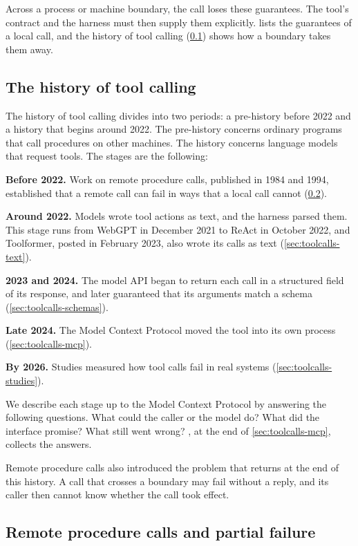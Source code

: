 Across a process or machine boundary, the call loses these guarantees. The tool's contract and the
harness must then supply them explicitly.  lists the guarantees of a local call,
and the history of tool calling (\cref{sec:toolcalls-history}) shows how a boundary takes them away.

\subsection{The history of tool calling}
\label{sec:toolcalls-history}

The history of tool calling divides into two periods: a pre-history before 2022 and a history that
begins around 2022. The pre-history concerns ordinary programs that call procedures on other
machines. The history concerns language models that request tools. The stages are the following:
\bi
\item \textbf{Before 2022.} Work on remote procedure calls, published in 1984 and 1994, established
that a remote call can fail in ways that a local call cannot (\cref{sec:toolcalls-rpc}).
\item \textbf{Around 2022.} Models wrote tool actions as text, and the harness parsed them. This
stage runs from WebGPT in December 2021 to ReAct in October 2022, and Toolformer, posted in
February 2023, also wrote its calls as text (\cref{sec:toolcalls-text}).
\item \textbf{2023 and 2024.} The model API began to return each call in a structured field of its
response, and later guaranteed that its arguments match a schema (\cref{sec:toolcalls-schemas}).
\item \textbf{Late 2024.} The Model Context Protocol moved the tool into its own process
(\cref{sec:toolcalls-mcp}).
\item \textbf{By 2026.} Studies measured how tool calls fail in real systems
(\cref{sec:toolcalls-studies}).
\ei

We describe each stage up to the Model Context Protocol by answering the following questions. What
could the caller or the model do? What did the interface promise? What still went wrong?
, at the end of \cref{sec:toolcalls-mcp}, collects the answers.

Remote procedure calls also introduced the problem that returns at the end of this history. A call
that crosses a boundary may fail without a reply, and its caller then cannot know whether the call
took effect.

\subsection{Remote procedure calls and partial failure}
\label{sec:toolcalls-rpc}

